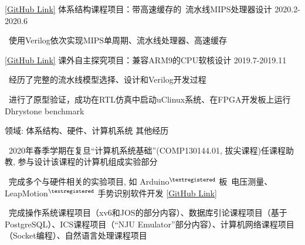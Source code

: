 

\begin{cventries}

  \cventry
    {\href{https://github.com/jasha64/MIPS-Pipeline-with-Cache}{[GitHub Link]}} %
    {体系结构课程项目：带高速缓存的\ 流水线MIPS处理器设计} %
    {2020.2-2020.6} %
    {} %
    {
      \begin{cvitems} %
        \item {\quad\bullet\ }{使用Verilog依次实现MIPS单周期、流水线处理器、高速缓存}
      \end{cvitems}
    }
    
  \cventry
    {\href{https://github.com/jasha64/ARM9-compatible-soft-CPU-core}{[GitHub Link]}} %
    {课外自主探究项目：兼容ARM9的CPU软核设计} %
    {2019.7-2019.11} %
    {} %
    {
      \begin{cvitems} %
        \item {\quad\bullet\ }{经历了完整的流水线模型选择、设计和Verilog开发过程}
        \item {\quad\bullet\ }{进行了原型验证，成功在RTL仿真中启动uClinux系统、在FPGA开发板上运行Dhrystone benchmark}
      \end{cvitems}
    }

  \cventry
    {领域: 体系结构、硬件、计算机系统} %
    {其他经历} %
    {} %
    {} %
    {
      \begin{cvitems}
        \item {\bullet\ }{2020年春季学期在复旦``计算机系统基础''(COMP130144.01, 拔尖课程)任课程助教, 参与设计该课程的计算机组成实验部分}
        \item {\bullet\ }{完成多个与硬件相关的实验项目, 如 Arduino$^{\textregistered}$ 板\ 电压测量、 LeapMotion$^{\textregistered}$ 手势识别软件开发 \href{https://github.com/jasha64/jasha64/tree/master/Fall\%202019/Hardware\%20Experiments}{[GitHub Link]}}
        \item {\bullet\ }{完成操作系统课程项目（xv6和JOS的部分内容）、数据库引论课程项目（基于PostgreSQL）、ICS课程项目（``NJU Emulator''部分内容）、计算机网络课程项目（Socket编程）、自然语言处理课程项目}
      \end{cvitems}
    }

\end{cventries}
